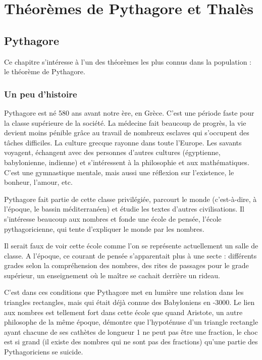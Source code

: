 \chapter{Théorèmes de Pythagore et Thalès}

\section{Pythagore}

Ce chapitre s'intéresse à l'un des théorèmes les plus connus dans la population : le théorème de Pythagore.

\subsection{Un peu d'histoire}

Pythagore est né 580 ans avant notre ère, en Grèce. C'est une période  faste pour la classe supérieure de la société. La médecine fait beaucoup de progrès, la vie devient moins pénible grâce au travail de nombreux esclaves qui s'occupent des tâches difficiles. La culture grecque rayonne dans toute l'Europe. Les savants voyagent, échangent avec des personnes d'autres cultures (égyptienne, babylonienne, indienne) et s'intéressent à la philosophie et aux mathématiques. C'est une gymnastique mentale, mais aussi une réflexion sur l'existence, le bonheur, l'amour, etc.

Pythagore fait partie de cette classe privilégiée, parcourt le monde (c'est-à-dire, à l'époque, le bassin méditerranéen) et étudie les textes d'autres civilisations. Il s'intéresse beaucoup aux nombres et fonde une école de pensée, l'école pythagoricienne, qui tente d'expliquer le monde par les nombres.

Il serait faux de voir cette école comme l'on se représente actuellement un salle de classe. A l'époque, ce courant de pensée s'apparentait plus à une secte : différents grades selon la compréhension des nombres, des rites de passages pour le grade supérieur, un enseignement où le maître se cachait derrière un rideau.

C'est dans ces conditions que Pythagore met en lumière une relation dans les triangles rectangles, mais qui était déjà connue des Babyloniens en -3000. Le lien aux nombres est tellement fort dans cette école que quand Aristote, un autre philosophe de la même époque, démontre que l'hypoténuse d'un triangle rectangle ayant chacune de ses cathètes de longueur 1 ne peut pas être une fraction, le choc est si grand (il existe des nombres qui ne sont pas des fractions) qu'une partie des Pythagoriciens se suicide.

